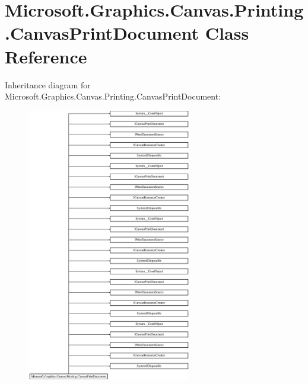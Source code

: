 \hypertarget{class_microsoft_1_1_graphics_1_1_canvas_1_1_printing_1_1_canvas_print_document}{}\section{Microsoft.\+Graphics.\+Canvas.\+Printing.\+Canvas\+Print\+Document Class Reference}
\label{class_microsoft_1_1_graphics_1_1_canvas_1_1_printing_1_1_canvas_print_document}
Inheritance diagram for Microsoft.\+Graphics.\+Canvas.\+Printing.\+Canvas\+Print\+Document\+:\begin{figure}[H]
\begin{center}
\leavevmode
\includegraphics[height=12.000000cm]{class_microsoft_1_1_graphics_1_1_canvas_1_1_printing_1_1_canvas_print_document}
\end{center}
\end{figure}
